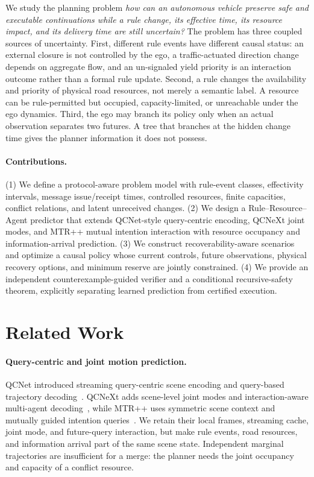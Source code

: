 \documentclass[letterpaper]{article} %
\begin{document}
We study the planning problem
\emph{how can an autonomous vehicle preserve safe and executable continuations while a rule change, its effective time, its resource impact, and its delivery time are still uncertain?}
The problem has three coupled sources of uncertainty. First, different rule events have different causal status: an external closure is not controlled by the ego, a traffic-actuated direction change depends on aggregate flow, and an un-signaled yield priority is an interaction outcome rather than a formal rule update. Second, a rule changes the availability and priority of physical road resources, not merely a semantic label. A resource can be rule-permitted but occupied, capacity-limited, or unreachable under the ego dynamics. Third, the ego may branch its policy only when an actual observation separates two futures. A tree that branches at the hidden change time gives the planner information it does not possess.

\paragraph{Contributions.}
(1) We define a protocol-aware problem model with rule-event classes, effectivity intervals, message issue/receipt times, controlled resources, finite capacities, conflict relations, and latent unreceived changes. (2) We design a Rule--Resource--Agent predictor that extends QCNet-style query-centric encoding, QCNeXt joint modes, and MTR++ mutual intention interaction with resource occupancy and information-arrival prediction. (3) We construct recoverability-aware scenarios and optimize a causal policy whose current controls, future observations, physical recovery options, and minimum reserve are jointly constrained. (4) We provide an independent counterexample-guided verifier and a conditional recursive-safety theorem, explicitly separating learned prediction from certified execution.

\section{Related Work}
\paragraph{Query-centric and joint motion prediction.}
QCNet introduced streaming query-centric scene encoding and query-based trajectory decoding~\citep{zhou2023query}. QCNeXt adds scene-level joint modes and interaction-aware multi-agent decoding~\citep{zhou2023qcnext}, while MTR++ uses symmetric scene context and mutually guided intention queries~\citep{shi2024mtr++}. We retain their local frames, streaming cache, joint mode, and future-query interaction, but make rule events, road resources, and information arrival part of the same scene state. Independent marginal trajectories are insufficient for a merge: the planner needs the joint occupancy and capacity of a conflict resource.
\end{document}
